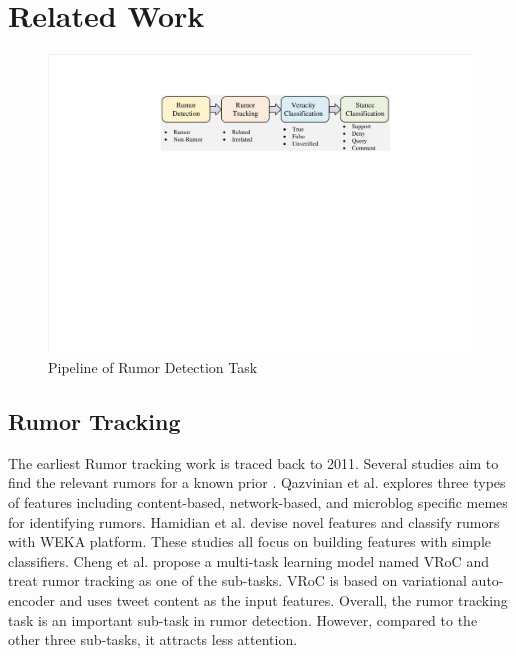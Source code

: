 \section{Related Work}
\label{sec:related}

\begin{figure}[tbp]
	\hspace{0ex}
	\vspace{0ex}
	\centering
	\includegraphics[width = \textwidth]{fig/pipeline}
	\caption{Pipeline of Rumor Detection Task}
	\label{fig:pipeline}
\end{figure}


\subsection{Rumor Tracking}
\label{sec:rumortracking}
The earliest Rumor tracking work is traced back to 2011. Several studies aim to find the relevant rumors for a known prior \cite{DBLP:journals/csur/ZubiagaABLP18}. Qazvinian et al. \cite{DBLP:conf/emnlp/QazvinianRRM11} explores three types of features including content-based, network-based, and microblog specific memes for identifying rumors. Hamidian et al. \cite{DBLP:journals/corr/abs-1912-08926} devise novel features and classify rumors with WEKA platform. These studies all focus on building features with simple classifiers. Cheng et al. \cite{DBLP:conf/www/ChengNB20} propose a multi-task learning model named VRoC and treat rumor tracking as one of the sub-tasks. VRoC is based on variational auto-encoder and uses tweet content as the input features. Overall, the rumor tracking task is an important sub-task in rumor detection. However, compared to the other three sub-tasks, it attracts less attention.

